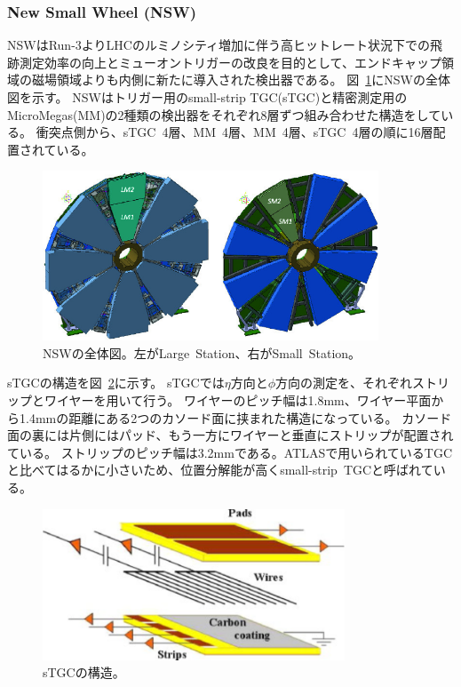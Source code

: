 \subsubsection{New Small Wheel (NSW)}
NSWはRun-3よりLHCのルミノシティ増加に伴う高ヒットレート状況下での飛跡測定効率の向上とミューオントリガーの改良を目的として、エンドキャップ領域の磁場領域よりも内側に新たに導入された検出器である。
図~\ref{fig:2-23}にNSWの全体図を示す。
NSWはトリガー用のsmall-strip TGC(sTGC)と精密測定用のMicroMegas(MM)の2種類の検出器をそれぞれ8層ずつ組み合わせた構造をしている。
衝突点側から、sTGC~4層、MM~4層、MM~4層、sTGC~4層の順に16層配置されている。

\begin{figure}[h]
  \centering
  \includegraphics[clip, width=10cm]{fig/2/NSW_structure.png}
  \caption{NSWの全体図\cite{article:ATLASNSWTDR}。左がLarge~Station、右がSmall~Station。}
  \label{fig:2-23}
\end{figure}

sTGCの構造を図~\ref{fig:2-24}に示す。
sTGCでは$\eta$方向と$\phi$方向の測定を、それぞれストリップとワイヤーを用いて行う。
ワイヤーのピッチ幅は1.8mm、ワイヤー平面から1.4mmの距離にある2つのカソード面に挟まれた構造になっている。
カソード面の裏には片側にはパッド、もう一方にワイヤーと垂直にストリップが配置されている。
ストリップのピッチ幅は3.2mmである。ATLASで用いられているTGCと比べてはるかに小さいため、位置分解能が高くsmall-strip~TGCと呼ばれている。

\begin{figure}[h]
  \centering
  \includegraphics[clip, width=9cm]{fig/2/stgc-structure.pdf}
  \caption{sTGCの構造\cite{article:ATLASNSWTDR}。}
  \label{fig:2-24}
\end{figure}

